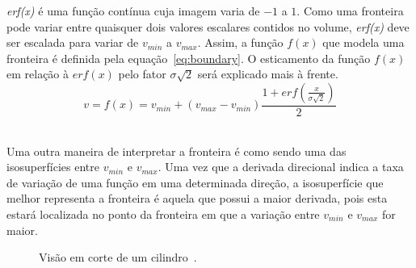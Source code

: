 	\textit{erf(x)} é uma função contínua cuja imagem varia de $-1$ a $1$. Como uma fronteira pode variar entre quaisquer dois valores escalares contidos no volume, \textit{erf(x)} deve ser escalada para variar de $v_{min}$ a $v_{max}$. Assim, a função $f(x)$ que modela uma fronteira é definida pela equação~\eqref{eq:boundary}. O esticamento da função $ f(x) $ em relação à $ erf(x) $ pelo fator $ \sigma\sqrt{2} $ será explicado mais à frente.
	\\

\begin{equation} \label{eq:boundary}
	v = f(x) = v_{min} + (v_{max} - v_{min}) \frac{1 + erf(\frac{x}{\sigma\sqrt{2}})}{2}
\end{equation} \

	Uma outra maneira de interpretar a fronteira é como sendo uma das isosuperfícies entre $v_{min}$ e $v_{max}$. Uma vez que a derivada direcional indica a taxa de variação de uma função em uma determinada direção, a isosuperfície que melhor representa a fronteira é aquela que possui a maior derivada, pois esta estará localizada no ponto da fronteira em que a variação entre $v_{min}$ e $v_{max}$ for maior.
	
\begin{figure}[h]
	\centering
	\caption{Visão em corte de um cilindro~\cite{gordon}.}
	\label{fig:g_isosurfaces}
\end{figure}
	
